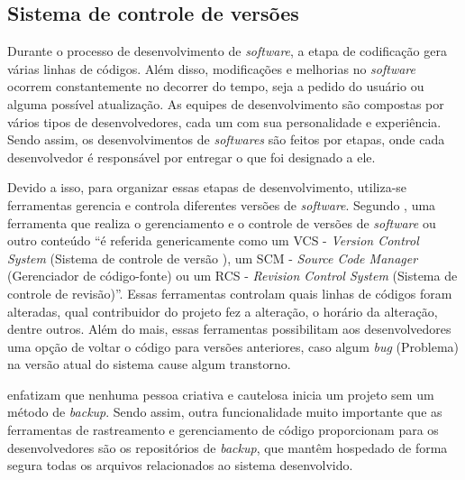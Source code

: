 \subsection{\textbf{Sistema de controle de versões}}

Durante o processo de desenvolvimento de \textit{software}, a etapa de codificação gera várias linhas de códigos. Além disso, modificações e melhorias no \textit{software} ocorrem constantemente no decorrer do tempo, seja a pedido do usuário ou alguma possível atualização.  As equipes de desenvolvimento são compostas por vários tipos de desenvolvedores, cada um com sua personalidade e experiência. Sendo assim, os desenvolvimentos de \textit{softwares} são feitos por etapas, onde cada desenvolvedor é responsável por entregar o que foi designado a ele. 

Devido a isso, para organizar essas etapas de desenvolvimento, utiliza-se ferramentas gerencia e controla diferentes versões de \textit{software}.  Segundo ,  uma ferramenta que realiza o gerenciamento e o controle de versões de \textit{software} ou outro conteúdo “é referida genericamente como um VCS - \textit{Version Control System} (Sistema de controle de versão ), um SCM - \textit{Source Code Manager} (Gerenciador de código-fonte) ou um RCS - \textit{Revision Control System} (Sistema de controle de revisão)”. Essas ferramentas controlam quais linhas de códigos foram alteradas, qual contribuidor do projeto fez a alteração, o horário da alteração, dentre outros. Além do mais, essas ferramentas possibilitam aos desenvolvedores uma opção de voltar o código para versões anteriores, caso algum \textit{bug} (Problema) na versão atual do sistema cause algum transtorno.

 enfatizam que nenhuma pessoa criativa e cautelosa inicia um projeto sem um método de \textit{backup}. Sendo assim, outra funcionalidade muito importante que as ferramentas de rastreamento e gerenciamento de código proporcionam para os desenvolvedores são os repositórios de \textit{backup}, que mantêm hospedado de forma segura todas os arquivos relacionados ao sistema desenvolvido.